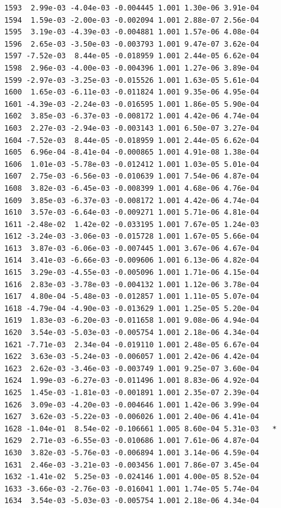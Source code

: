 \documentclass[
  letterpaper,
  DIV=11,
  numbers=noendperiod]{scrartcl}
\begin{document}
\begin{verbatim}
1593  2.99e-03 -4.04e-03 -0.004445 1.001 1.30e-06 3.91e-04    
1594  1.59e-03 -2.00e-03 -0.002094 1.001 2.88e-07 2.56e-04    
1595  3.19e-03 -4.39e-03 -0.004881 1.001 1.57e-06 4.08e-04    
1596  2.65e-03 -3.50e-03 -0.003793 1.001 9.47e-07 3.62e-04    
1597 -7.52e-03  8.44e-05 -0.018959 1.001 2.44e-05 6.62e-04    
1598  2.96e-03 -4.00e-03 -0.004396 1.001 1.27e-06 3.89e-04    
1599 -2.97e-03 -3.25e-03 -0.015526 1.001 1.63e-05 5.61e-04    
1600  1.65e-03 -6.11e-03 -0.011824 1.001 9.35e-06 4.95e-04    
1601 -4.39e-03 -2.24e-03 -0.016595 1.001 1.86e-05 5.90e-04    
1602  3.85e-03 -6.37e-03 -0.008172 1.001 4.42e-06 4.74e-04    
1603  2.27e-03 -2.94e-03 -0.003143 1.001 6.50e-07 3.27e-04    
1604 -7.52e-03  8.44e-05 -0.018959 1.001 2.44e-05 6.62e-04    
1605  6.96e-04 -8.41e-04 -0.000865 1.001 4.91e-08 1.38e-04    
1606  1.01e-03 -5.78e-03 -0.012412 1.001 1.03e-05 5.01e-04    
1607  2.75e-03 -6.56e-03 -0.010639 1.001 7.54e-06 4.87e-04    
1608  3.82e-03 -6.45e-03 -0.008399 1.001 4.68e-06 4.76e-04    
1609  3.85e-03 -6.37e-03 -0.008172 1.001 4.42e-06 4.74e-04    
1610  3.57e-03 -6.64e-03 -0.009271 1.001 5.71e-06 4.81e-04    
1611 -2.48e-02  1.42e-02 -0.033195 1.001 7.67e-05 1.24e-03    
1612 -3.24e-03 -3.06e-03 -0.015728 1.001 1.67e-05 5.66e-04    
1613  3.87e-03 -6.06e-03 -0.007445 1.001 3.67e-06 4.67e-04    
1614  3.41e-03 -6.66e-03 -0.009606 1.001 6.13e-06 4.82e-04    
1615  3.29e-03 -4.55e-03 -0.005096 1.001 1.71e-06 4.15e-04    
1616  2.83e-03 -3.78e-03 -0.004132 1.001 1.12e-06 3.78e-04    
1617  4.80e-04 -5.48e-03 -0.012857 1.001 1.11e-05 5.07e-04    
1618 -4.79e-04 -4.90e-03 -0.013629 1.001 1.25e-05 5.20e-04    
1619  1.83e-03 -6.20e-03 -0.011658 1.001 9.08e-06 4.94e-04    
1620  3.54e-03 -5.03e-03 -0.005754 1.001 2.18e-06 4.34e-04    
1621 -7.71e-03  2.34e-04 -0.019110 1.001 2.48e-05 6.67e-04    
1622  3.63e-03 -5.24e-03 -0.006057 1.001 2.42e-06 4.42e-04    
1623  2.62e-03 -3.46e-03 -0.003749 1.001 9.25e-07 3.60e-04    
1624  1.99e-03 -6.27e-03 -0.011496 1.001 8.83e-06 4.92e-04    
1625  1.45e-03 -1.81e-03 -0.001891 1.001 2.35e-07 2.39e-04    
1626  3.09e-03 -4.20e-03 -0.004646 1.001 1.42e-06 3.99e-04    
1627  3.62e-03 -5.22e-03 -0.006026 1.001 2.40e-06 4.41e-04    
1628 -1.04e-01  8.54e-02 -0.106661 1.005 8.60e-04 5.31e-03   *
1629  2.71e-03 -6.55e-03 -0.010686 1.001 7.61e-06 4.87e-04    
1630  3.82e-03 -5.76e-03 -0.006894 1.001 3.14e-06 4.59e-04    
1631  2.46e-03 -3.21e-03 -0.003456 1.001 7.86e-07 3.45e-04    
1632 -1.41e-02  5.25e-03 -0.024146 1.001 4.00e-05 8.52e-04    
1633 -3.66e-03 -2.76e-03 -0.016041 1.001 1.74e-05 5.74e-04    
1634  3.54e-03 -5.03e-03 -0.005754 1.001 2.18e-06 4.34e-04    

\end{verbatim}
\end{document}

